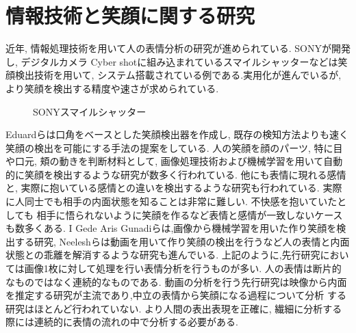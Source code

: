 \section{情報技術と笑顔に関する研究}
近年, 情報処理技術を用いて人の表情分析の研究が進められている.
SONYが開発し, デジタルカメラ Cyber shotに組み込まれているスマイルシャッターなどは笑顔検出技術を用いて,
システム搭載されている例である.実用化が進んでいるが, より笑顔を検出する精度や速さが求められている.
\begin{figure}[htbp]
    \begin{center}
    \end{center}
    \caption{SONYスマイルシャッター}
    \label{fig:sony_smile_shutter}
\end{figure}

Eduardらは口角をベースとした笑顔検出器を作成し, 既存の検知方法よりも速く笑顔の検出を可能にする手法の提案をしている.\cite{EduardRoyce}
人の笑顔を顔のパーツ, 特に目や口元, 頬の動きを判断材料として, 画像処理技術および機械学習を用いて自動的に笑顔を検出するような研究が数多く行われている.
他にも表情に現れる感情と, 実際に抱いている感情との違いを検出するような研究も行われている.
実際に人同士でも相手の内面状態を知ることは非常に難しい. 不快感を抱いていたとしても 相手に悟られないように笑顔を作るなど表情と感情が一致しないケースも数多くある.
I Gede Aris Gunadiらは,画像から機械学習を用いた作り笑顔を検出する研究\cite{IGedeArisGunadi}, Neeleshらは動画を用いて作り笑顔の検出\cite{NeeleshBhakt}を行うなど人の表情と内面状態との乖離を解消するような研究も進んでいる.
上記のように,先行研究においては画像1枚に対して処理を行い表情分析を行うものが多い.
人の表情は断片的なものではなく連続的なものである.
動画の分析を行う先行研究は映像から内面を推定する研究が主流であり,中立の表情から笑顔になる過程について分析
する研究はほとんど行われていない.
より人間の表出表現を正確に, 繊細に分析する際には連続的に表情の流れの中で分析する必要がある.


